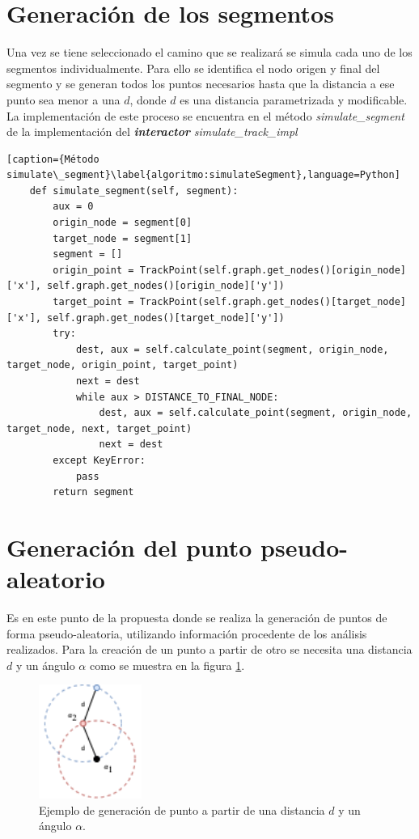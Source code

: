 \section{Generación de los segmentos}

Una vez se tiene seleccionado el camino que se realizará se simula cada uno de los segmentos 
individualmente. Para ello se identifica el nodo origen y final del segmento y se generan todos los puntos 
necesarios hasta que la distancia a ese punto sea menor a una $d$, donde $d$ es una distancia 
parametrizada y modificable. 
La implementación de este proceso se encuentra en el método \textit{simulate\_segment} de la implementación del \textbf{\textit{interactor}} \textit{simulate\_track\_impl}

\begin{lstlisting}[caption={Método simulate\_segment}\label{algoritmo:simulateSegment},language=Python] 
    def simulate_segment(self, segment):
        aux = 0
        origin_node = segment[0]
        target_node = segment[1]
        segment = []
        origin_point = TrackPoint(self.graph.get_nodes()[origin_node]['x'], self.graph.get_nodes()[origin_node]['y'])
        target_point = TrackPoint(self.graph.get_nodes()[target_node]['x'], self.graph.get_nodes()[target_node]['y'])
        try:
            dest, aux = self.calculate_point(segment, origin_node, target_node, origin_point, target_point)
            next = dest
            while aux > DISTANCE_TO_FINAL_NODE:
                dest, aux = self.calculate_point(segment, origin_node, target_node, next, target_point)
                next = dest
        except KeyError:
            pass
        return segment
\end{lstlisting}

\newpage
\section{Generación del punto pseudo-aleatorio}

Es en este punto de la propuesta donde se realiza la generación de puntos de forma pseudo-aleatoria, 
utilizando información procedente de los análisis realizados. Para la creación de un punto a partir de otro 
se necesita una distancia $d$ y un ángulo $\alpha$ como se muestra en la figura 
\ref{figure:PointGeneration01}.
\begin{figure}[!htb]
\begin{center}
\includegraphics[scale=0.75, width=0.3\textwidth]{./Imagenes/PointGeneration01.png}
\caption{Ejemplo de generación de punto a partir de una distancia $d$ y un ángulo $\alpha$.}
\label{figure:PointGeneration01}
\end{center}
\end{figure}

